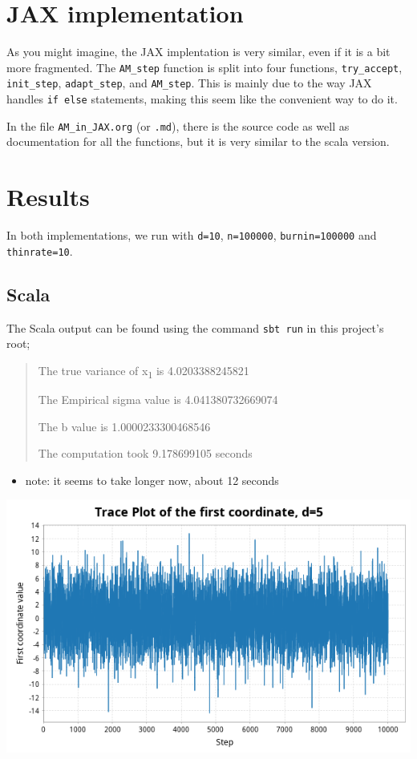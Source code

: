 \documentclass[letterpaper]{article}
\begin{document}
\section{JAX implementation}
\label{sec:orgf808d66}

As you might imagine, the JAX implentation is very similar, even if it is a bit more fragmented. The \texttt{AM\_step} function is split into four functions, \texttt{try\_accept}, \texttt{init\_step}, \texttt{adapt\_step}, and \texttt{AM\_step}. This is mainly due to the way JAX handles \texttt{if else} statements, making this seem like the convenient way to do it.

In the file \texttt{AM\_in\_JAX.org} (or \texttt{.md}), there is the source code as well as documentation for all the functions, but it is very similar to the scala version.
\section{Results}
\label{sec:orgd64fb55}

In both implementations, we run with \texttt{d=10}, \texttt{n=100000}, \texttt{burnin=100000} and \texttt{thinrate=10}.
\subsection{Scala}
\label{sec:org0c8008c}

The Scala output can be found using the command \texttt{sbt run} in this project's root;

\begin{quote}
The true variance of x\textsubscript{1} is 4.0203388245821

The Empirical sigma value is 4.041380732669074

The b value is 1.0000233300468546

The computation took 9.178699105 seconds
\end{quote}

\begin{itemize}
\item note: it seems to take longer now, about 12 seconds
\end{itemize}

\begin{center}
\includegraphics[width=.9\linewidth]{./Figures/adaptive_trace_scala.png}
\end{center}
\end{document}
